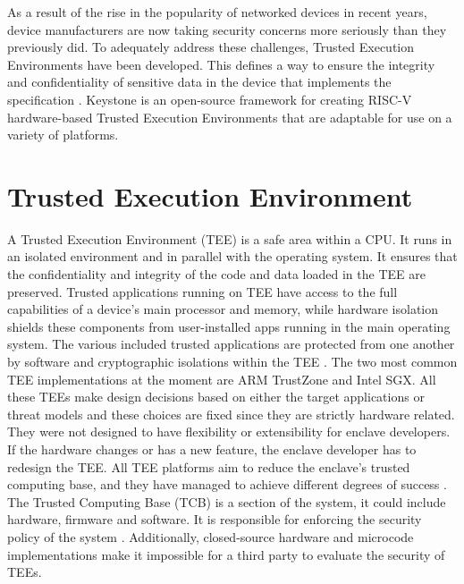 
As a result of the rise in the popularity of networked devices in recent years, device manufacturers are now taking security concerns more seriously than they previously did. 
To adequately address these challenges, Trusted Execution Environments have been developed. This defines a way to ensure the integrity and confidentiality of sensitive data in the device that implements the specification \cite{IntroTEE}. Keystone \cite{lee2020keystone} is an open-source framework for creating RISC-V hardware-based Trusted Execution Environments that are adaptable for use on a variety of platforms. 

\section{Trusted Execution Environment}
A Trusted Execution Environment (TEE) is a safe area within a CPU. It runs in an isolated environment and in parallel with the operating system.
It ensures that the confidentiality and integrity of the code and data loaded in the TEE are preserved. 
Trusted applications running on TEE have access to the full capabilities of a device's main processor and memory, while hardware isolation shields these components from user-installed apps running in the main operating system. The various included trusted applications are protected from one another by software and cryptographic isolations within the TEE \cite{IntroTEE}.
The two most common TEE implementations at the moment are ARM TrustZone and Intel SGX. All these TEEs make design decisions based on either the target applications or threat models and these choices are fixed since they are strictly hardware related. They were not designed to have flexibility or extensibility for enclave developers. If the hardware changes or has a new feature, the enclave developer has to redesign the TEE.
All TEE platforms aim to reduce the enclave's trusted computing base, and they have managed to achieve different degrees of success \cite{keysyone-blog-1}. The Trusted Computing Base (TCB) is a section of the system, it could include hardware, firmware and software. It is responsible for enforcing the security policy of the system \cite{tcb-def}. Additionally, closed-source hardware and microcode implementations make it impossible for a third party to evaluate the security of TEEs.

